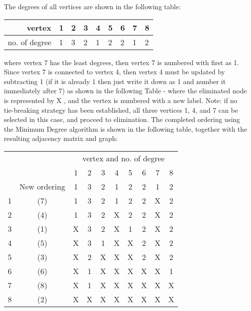   The degrees of all vertices are shown in the following table:
      \begin{center}
          \begin{tabular}{ r | l l l l l l l l }
          vertex          & 1 & 2 & 3 & 4 & 5 & 6 & 7 & 8 \\
          \hline
          no. of degree   & 1 & 3 & 2 & 1 & 2 & 2 & 1 & 2 \\
      \end{tabular}
  \end{center}
  where vertex 7 has the least degrees, then vertex 7 is numbered with first as 1.
  Since vertex 7 is connected to vertex 4, then vertex 4 must be updated by
  subtracting 1 (if it is already 1 then just write it down as 1 and number it
  immediately after 7) as shown in the following Table - where the eliminated node
  is represented by X , and the vertex is numbered with a new label. Note: if no
  tie-breaking strategy has been established, all three vertices 1, 4, and 7 can
  be selected in this case, and proceed to elimination. The completed ordering
  using the Minimum Degree algorithm is shown in the following table, together
  with the resulting adjacency matrix and graph:
  \begin{center}
      \begin{tabular}{cc|cccccccc}
          \multicolumn{2}{p{1.5cm}|}{} &
          \multicolumn{8}{c}{vertex and no. of degree} \\
          \small
              &               & 1 & 2 & 3 & 4 & 5 & 6 & 7 & 8 \\
              &New ordering   & 1 & 3 & 2 & 1 & 2 & 2 & 1 & 2 \\
          \hline
           1  &(7)            & 1 & 3 & 2 & 1 & 2 & 2 & X & 2 \\
           2  &(4)            & 1 & 3 & 2 & X & 2 & 2 & X & 2 \\
           3  &(1)            & X & 3 & 2 & X & 1 & 2 & X & 2 \\
           4  &(5)            & X & 3 & 1 & X & X & 2 & X & 2 \\
           5  &(3)            & X & 2 & X & X & X & 2 & X & 2 \\
           6  &(6)            & X & 1 & X & X & X & X & X & 1 \\
           7  &(8)            & X & 1 & X & X & X & X & X & X \\
           8  &(2)            & X & X & X & X & X & X & X & X \\
      \end{tabular}
  \end{center}
  
